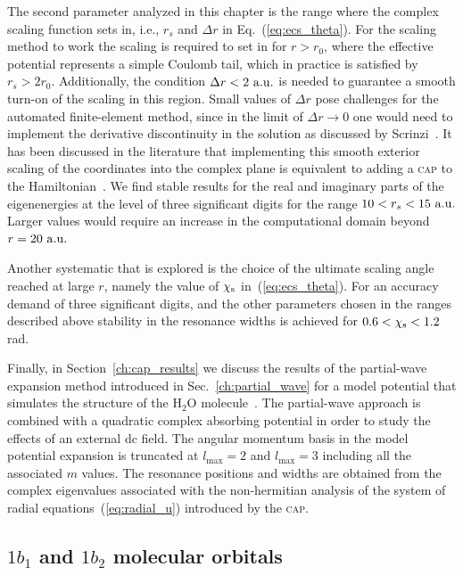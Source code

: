The second parameter analyzed in this chapter is the range where the
complex scaling function sets in, i.e., $r_{s}$ and $\Delta r$ in
Eq.~(\ref{eq:ecs_theta}). For the scaling method to work the scaling
is required to set in for $r > r_0$, where the effective potential
represents a simple Coulomb tail, which in practice is satisfied by
$r_{s} > 2r_{0}$. Additionally, the condition $\Delta r <
2\ \rm{a.u.}$ is needed to guarantee a smooth turn-on of the scaling
in this region. Small values of $\Delta r$ pose challenges for the
automated finite-element method, since in the limit of $\Delta r \to
0$ one would need to implement the derivative discontinuity in the
solution as discussed by Scrinzi~\cite{ecsScrinzi}. It has been
discussed in the literature that implementing this smooth exterior
scaling of the coordinates into the complex plane is equivalent to
adding a \textsc{cap} to the
Hamiltonian~\cite{ECS_sim_CAP_1991,ECS_sim_CAP_1998}. We find stable
results for the real and imaginary parts of the eigenenergies at the
level of three significant digits for the range $10 < r_{s} <
15\ \rm{a.u.}$ Larger values would require an increase in the
computational domain beyond $r=20\ \rm{a.u.}$

Another systematic that is explored is the choice of the ultimate
scaling angle reached at large $r$, namely the value of
$\chi_{\rm{s}}$ in~(\ref{eq:ecs_theta}). For an accuracy demand of
three significant digits, and the other parameters chosen in the
ranges described above stability in the resonance widths is achieved
for $0.6< \chi_{\rm{s}} < 1.2$ rad.

Finally, in Section~\ref{ch:cap_results} we discuss the results of the
partial-wave expansion method introduced in Sec.~\ref{ch:partial_wave}
for a model potential that simulates the structure of the H$_{2}$O
molecule~\cite{illescas_modelV_2011}. The partial-wave approach is
combined with a quadratic complex absorbing potential in order to
study the effects of an external dc field. The angular momentum basis
in the model potential expansion is truncated at $l_{\mathrm{max}} =
2$ and $l_{\mathrm{max}} = 3$ including all the associated $m$
values. The resonance positions and widths are obtained from the
complex eigenvalues associated with the non-hermitian analysis of the
system of radial equations~(\ref{eq:radial_u}) introduced by the
\textsc{cap}.


\subsection{$1b_{1}$ and $1b_{2}$ molecular orbitals}
\label{ch:1b1_1b2_results}


